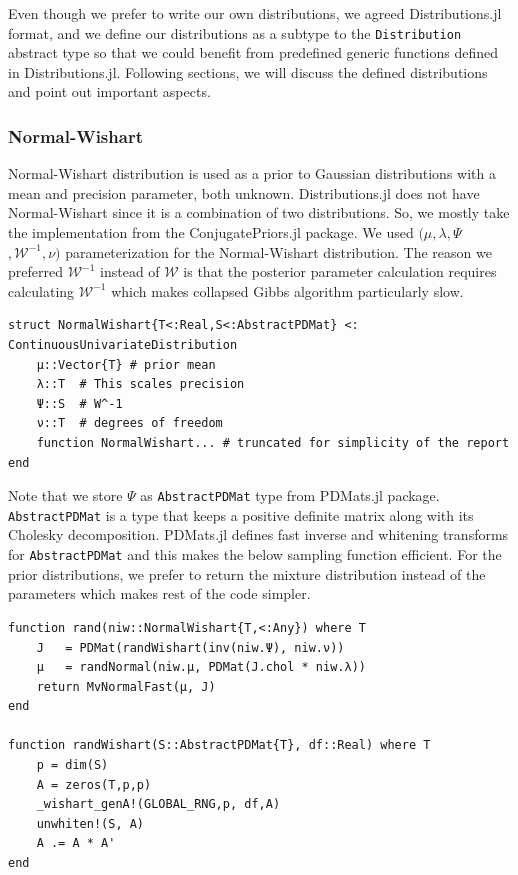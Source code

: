 \documentclass[12pt, a4paper]{article}
\newenvironment{code}{\captionsetup{type=listing}}{}
\begin{document}
Even though we prefer to write our own distributions, we agreed Distributions.jl format, and we define our distributions as a subtype to the \texttt{Distribution} abstract type so that we could benefit from predefined generic functions defined in Distributions.jl. Following sections, we will discuss the defined distributions and point out important aspects.

\subsubsection{Normal-Wishart}
Normal-Wishart distribution is used as a prior to Gaussian distributions with a mean and precision parameter, both unknown. Distributions.jl does not have Normal-Wishart since it is a combination of two distributions. So, we mostly take the implementation from the ConjugatePriors.jl package. We used $(\mu, \lambda, \Psi$ $, \mathcal{W}^{-1} ,\nu)$ parameterization for the Normal-Wishart distribution. The reason we preferred $\mathcal{W}^{-1}$ instead of $\mathcal{W}$ is that the posterior parameter calculation requires calculating $\mathcal{W}^{-1}$ which makes collapsed Gibbs algorithm particularly slow. 
\begin{code}
\label{code:nw-code}
\begin{verbatim}
struct NormalWishart{T<:Real,S<:AbstractPDMat} <: ContinuousUnivariateDistribution
    μ::Vector{T} # prior mean
    λ::T  # This scales precision 
    Ψ::S  # W^-1
    ν::T  # degrees of freedom
    function NormalWishart... # truncated for simplicity of the report
end
\end{verbatim}
\end{code}
Note that we store $\Psi$ as \texttt{AbstractPDMat} type from PDMats.jl package. \texttt{AbstractPDMat} is a type that keeps a positive definite matrix along with its Cholesky decomposition. PDMats.jl defines fast inverse and whitening transforms for \texttt{AbstractPDMat} and this makes the below sampling function efficient. For the prior distributions, we prefer to return the mixture distribution instead of the parameters which makes rest of the code simpler.
\begin{code}
\label{code:nw-sampler}
\begin{verbatim}
function rand(niw::NormalWishart{T,<:Any}) where T
    J   = PDMat(randWishart(inv(niw.Ψ), niw.ν))
    μ   = randNormal(niw.μ, PDMat(J.chol * niw.λ))
    return MvNormalFast(μ, J)
end

function randWishart(S::AbstractPDMat{T}, df::Real) where T
    p = dim(S)
    A = zeros(T,p,p)
    _wishart_genA!(GLOBAL_RNG,p, df,A)
    unwhiten!(S, A)
    A .= A * A'
end
\end{verbatim}
\end{code}
\end{document}
